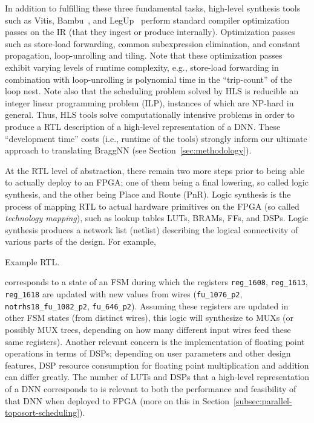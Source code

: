 In addition to fulfilling these three fundamental tasks, high-level synthesis tools such as Vitis, Bambu~\cite{ferrandi2021bambu}, and LegUp~\cite{10.1145/2514740} perform standard compiler optimization passes on the IR (that they ingest or produce internally).
Optimization passes such as store-load forwarding, common subexpression elimination, and constant propagation, loop-unrolling and tiling.
Note that these optimization passes exhibit varying levels of runtime complexity, e.g., store-load forwarding in combination with loop-unrolling is polynomial time in the ``trip-count'' of the loop nest.
Note also that the scheduling problem solved by HLS is reducible an integer linear programming problem (ILP), instances of which are NP-hard in general.
Thus, HLS tools solve computationally intensive problems in order to produce a RTL description of a high-level representation of a DNN.
These ``development time'' costs (i.e., runtime of the tools) strongly inform our ultimate approach to translating BraggNN (see Section~\ref{sec:methodology}). 

At the RTL level of abstraction, there remain two more steps prior to being able to actually deploy to an FPGA; one of them being a final lowering, so called logic synthesis, and the other being Place and Route (PnR).
Logic synthesis is the process of mapping RTL to actual hardware primitives on the FPGA (so called \emph{technology mapping}), such as lookup tables LUTs, BRAMs, FFs, and DSPs.
Logic synthesis produces a network list (netlist) describing the logical connectivity of various parts of the design.
For example,
\begin{mylisting}{Example RTL.}
	
	\label{lst:long}
\end{mylisting}
\par\noindent corresponds to a state of an FSM during which the registers \texttt{reg\_1608}, \texttt{reg\_1613}, \texttt{reg\_1618} are updated with new values from wires (\texttt{fu\_1076\_p2}, \texttt{notrhs18\_fu\_1082\_p2}, \texttt{fu\_646\_p2}).
Assuming these registers are updated in other FSM states (from distinct wires), this logic will synthesize to MUXs (or possibly MUX trees, depending on how many different input wires feed these same registers).
Another relevant concern is the implementation of floating point operations in terms of DSPs; depending on user parameters and other design features, DSP resource consumption for floating point multiplication and addition can differ greatly.
The number of LUTs and DSPs that a high-level representation of a DNN corresponds to is relevant to both the performance and feasibility of that DNN when deployed to FPGA (more on this in Section~\ref{subsec:parallel-toposort-scheduling}).

